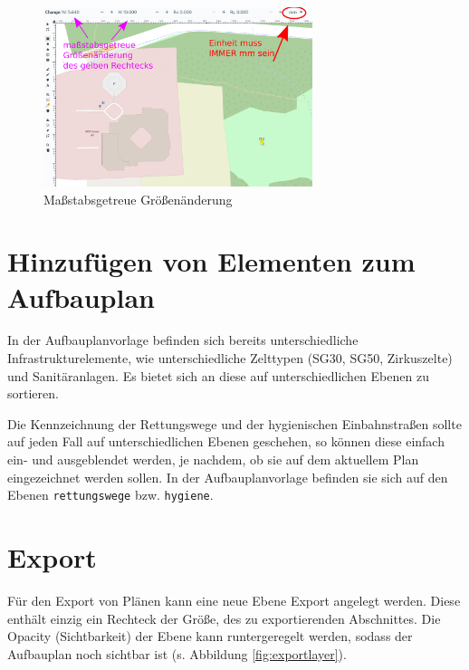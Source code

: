 \documentclass[letterpaper,12pt,
				parkskip = half]{article}
\begin{document}
\clearpage

\begin{figure}[!h]
	\centering
	\includegraphics[width=0.7\textwidth]{Images/mm.png}
	\caption{Maßstabsgetreue Größenänderung}
	\label{fig:mm}
\end{figure}


\section{Hinzufügen von Elementen zum Aufbauplan}

In der Aufbauplanvorlage befinden sich bereits unterschiedliche Infrastrukturelemente, wie unterschiedliche Zelttypen (SG30, SG50, Zirkuszelte) und Sanitäranlagen. Es bietet sich an diese auf unterschiedlichen Ebenen zu sortieren.

Die Kennzeichnung der Rettungswege und der hygienischen Einbahnstraßen sollte auf jeden Fall auf unterschiedlichen Ebenen geschehen, so können diese einfach ein- und ausgeblendet werden, je nachdem, ob sie auf dem aktuellem Plan eingezeichnet werden sollen. In der Aufbauplanvorlage befinden sie sich auf den Ebenen \texttt{rettungswege} bzw. \texttt{hygiene}.

\section{Export}

Für den Export von Plänen kann eine neue Ebene \flqq{}Export\frqq{} angelegt werden. Diese enthält einzig ein Rechteck der Größe, des zu exportierenden Abschnittes. Die \flqq{}Opacity\frqq{} (Sichtbarkeit) der Ebene kann runtergeregelt werden, sodass der Aufbauplan noch sichtbar ist (s. Abbildung \ref{fig:exportlayer}).


	
\clearpage
\end{document}
